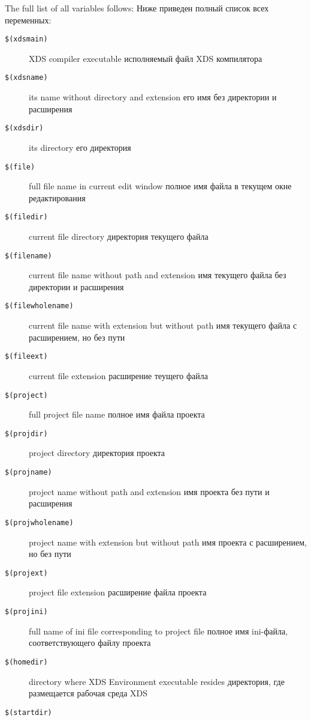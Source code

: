 \ifenglish
The full list of all variables follows:
\else
Ниже приведен полный список всех переменных:
\fi
\begin{description}
\item[{\tt \$(xdsmain)}] 
 \ifenglish
 XDS compiler executable
 \else
 исполняемый файл XDS компилятора
 \fi
\item[{\tt \$(xdsname)}] 
 \ifenglish
 its name without directory and extension
 \else
 его имя без директории и расширения
 \fi
\item[{\tt \$(xdsdir)}] 
 \ifenglish
 its directory
 \else
 его директория
 \fi
\item[{\tt \$(file)}] 
 \ifenglish
 full file name in current edit window
 \else
 полное имя файла в текущем окне редактирования
 \fi
\item[{\tt \$(filedir)}] 
 \ifenglish
 current file directory
 \else
 директория текущего файла
 \fi
\item[{\tt \$(filename)}] 
 \ifenglish
 current file name without path and extension
 \else
 имя текущего файла без директории и расширения
 \fi
\item[{\tt \$(filewholename)}] 
 \ifenglish
 current file name with extension but without path
 \else
 имя текущего файла с расширением, но без пути 
 \fi
\item[{\tt \$(fileext)}] 
 \ifenglish
 current file extension
 \else
 расширение теущего файла
 \fi
\item[{\tt \$(project)}] 
 \ifenglish
 full project file name
 \else
 полное имя файла проекта
 \fi
\item[{\tt \$(projdir)}] 
 \ifenglish
 project directory
 \else
 директория проекта
 \fi
\item[{\tt \$(projname)}] 
 \ifenglish
 project name without path and extension
 \else
 имя проекта без пути и расширения
 \fi
\item[{\tt \$(projwholename)}] 
 \ifenglish
 project name with extension but without path
 \else
 имя проекта с расширением, но без пути
 \fi
\item[{\tt \$(projext)}] 
 \ifenglish
 project file extension
 \else
 расширение файла проекта
 \fi
\item[{\tt \$(projini)}] 
 \ifenglish
 full name of ini file corresponding to project file
 \else
 полное имя ini-файла, соответствующего файлу проекта
 \fi
\item[{\tt \$(homedir)}] 
 \ifenglish
 directory where XDS Environment executable resides
 \else
 директория, где размещается рабочая среда XDS
 \fi
\item[{\tt \$(startdir)}] 

\end{description}
